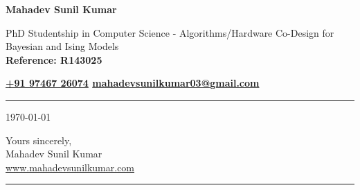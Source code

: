 \documentclass[11pt]{article}
\makeatletter
\newcommand{\myname}{Mahadev Sunil Kumar}
\newcommand{\myaddress}{PhD Studentship in Computer Science - Algorithms/Hardware Co-Design for Bayesian and Ising Models\\ \textbf{Reference: R143025}}
\newcommand{\myphone}{+91 97467 26074}
\newcommand{\myemail}{mahadevsunilkumar03@gmail.com}
\newcommand{\letterdate}{\today}
\makeatother
\begin{document}
\begin{center}
  \vspace*{-2.0em}
  {\fontsize{22}{27}\selectfont\bfseries\myname}\par
  \vspace{-0.8em}
  {\myaddress}\par
\end{center}
\vspace{-1.8em}
{\bfseries \href{tel:\myphone}{\myphone} \hfill \href{mailto:\myemail}{\myemail}}\par
\vspace{-1.5em}
\rule{\linewidth}{0.8pt}
\vspace{-2em}

\letterdate



Yours sincerely,\\
\myname\\
\href{https://www.mahadevsunilkumar.com}{www.mahadevsunilkumar.com}

\vspace{-1.5em}
\rule{\linewidth}{0.8pt}
\end{document}
